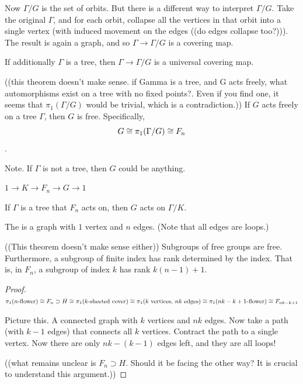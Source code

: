 \documentclass[11pt,leqno,oneside]{amsart}
\numberwithin{thm}{section}
\newcommand{\fund}[1][1]{\pi_{#1}}
\begin{document}
Now $\Gamma/G$ is the set of orbits.  But there is a different way to interpret $\Gamma/G$.  Take the original $\Gamma$, and for each orbit, collapse all the vertices in that orbit into a single vertex (with induced movement on the edges ((do edges collapse too?))).  The result is again a graph, and so $\Gamma \to \Gamma/G$ is a covering map.

If additionally $\Gamma$ is a tree, then $\Gamma \to \Gamma/G$ is a universal covering map.

\begin{thm}
  ((this theorem doesn't make sense.  if Gamma is a tree, and G acts freely, what automorphisms exist on a tree with no fixed points?.  Even if you find one, it seems that $\fund(\Gamma/G)$ would be trivial, which is a contradiction.))
  If $G$ acts freely on a tree $\Gamma$, then $G$ is free.  Specifically, $$G \isom \fund(\Gamma/G) \isom F_n$$.
\end{thm}
\begin{rmk}
  Note.  If $\Gamma$ is not a tree, then $G$ could be anything.
\end{rmk}

$1 \to K \to F_n \to G \to 1$

If $\Gamma$ is a tree that $F_n$ acts on, then $G$ acts on $\Gamma/K$.

\begin{defn}
  The  is a graph with $1$ vertex and $n$ edges.  (Note that all edges are loops.)
\end{defn}
\begin{thm}
  ((This theorem doesn't make sense either))
  Subgroups of free groups are free.  Furthermore, a subgroup of finite index has rank determined by the index.  That is, in $F_n$, a subgroup of index $k$ has rank $k(n-1)+1$.
\end{thm}
\begin{proof}
  $\fund(n\text{-flower}) \isom F_n \supset H \isom \fund(k\text{-sheeted cover}) \isom \fund(\text{$k$ vertices, $nk$ edges}) \isom \fund(\text{$nk - k + 1$-flower}) \isom F_{nk - k + 1}$

  Picture this.  A connected graph with $k$ vertices and $nk$ edges.  Now take a path (with $k-1$ edges) that connects all $k$ vertices.  Contract the path to a single vertex.  Now there are only $nk - (k-1)$ edges left, and they are all loops!

((what remains unclear is $F_n \supset H$.  Should it be facing the other way?  It is crucial to understand this argument.))
\end{proof}
\end{document}
